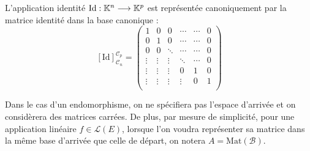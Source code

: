 \begin{example}
    L'application identité $ \text{Id} : \mathbb{K}^n \longrightarrow \mathbb{K}^p $ est représentée canoniquement par la matrice identité 
    dans la base canonique : 
        \[ [\text{Id}]_{\mathcal{C}_n}^{\mathcal{C}_p} = 
            \begin{pmatrix}
                1 & 0 & 0 & \cdots & \cdots & 0 \\ 
                0 & 1 & 0 & \cdots & \cdots & 0 \\ 
                0 & 0 & \ddots & \cdots & \cdots & 0 \\ 
                \vdots & \vdots & \vdots & \ddots & \cdots & 0 \\ 
                \vdots & \vdots & \vdots & 0 & 1 & 0 \\ 
                \vdots & \vdots & \vdots & \vdots & 0 & 1 \\ 
            \end{pmatrix} \] 
\end{example}

\begin{remark}
    Dans le cas d'un endomorphisme, on ne spécifiera pas l'espace d'arrivée et on considèrera 
    des matrices carrées. 
    De plus, par mesure de simplicité, pour une application linéaire $f \in \mathcal{L}(E)$, lorsque l'on voudra 
    représenter sa matrice dans la même base d'arrivée que celle de départ, on notera $A = \text{Mat}( \mathcal{B})$. 
\end{remark}

